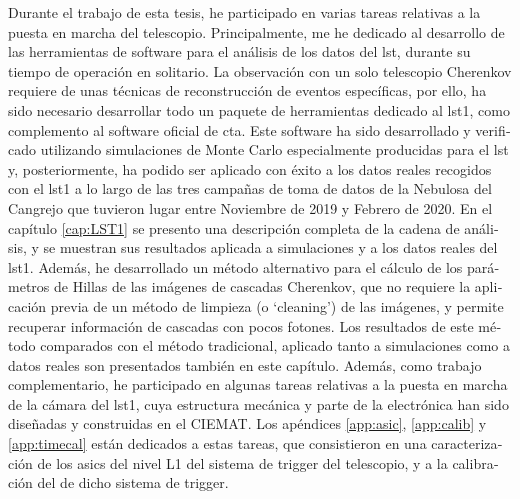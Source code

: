 \documentclass[main.tex]{subfiles}
\begin{document}
\begin{otherlanguage}{spanish}
Durante el trabajo de esta tesis, he participado en varias tareas relativas a la puesta en marcha del telescopio. Principalmente, me he dedicado al desarrollo de las herramientas de software para el análisis de los datos del \gls{lst}, durante su tiempo de operación en solitario. La observación con un solo telescopio Cherenkov requiere de unas técnicas de reconstrucción de eventos específicas, por ello, ha sido necesario desarrollar todo un paquete de herramientas dedicado al \gls{lst}1, como complemento al software oficial de \gls{cta}. Este software ha sido desarrollado y verificado utilizando simulaciones de Monte Carlo especialmente producidas para el \gls{lst} y, posteriormente, ha podido ser aplicado con éxito a los datos reales recogidos con el \gls{lst}1 a lo largo de las tres campañas de toma de datos de la Nebulosa del Cangrejo que tuvieron lugar entre Noviembre de 2019 y Febrero de 2020. En el capítulo \ref{cap:LST1} se presento una descripción completa de la cadena de análisis, y se muestran sus resultados aplicada a simulaciones y a los datos reales del \gls{lst}1. Además, he desarrollado un método alternativo para el cálculo de los parámetros de Hillas de las imágenes de cascadas Cherenkov, que no requiere la aplicación previa de un método de limpieza (o `cleaning') de las imágenes, y permite recuperar información de cascadas con pocos fotones. Los resultados de este método comparados con el método tradicional, aplicado tanto a simulaciones como a datos reales son presentados también en este capítulo. Además, como trabajo complementario, he participado en algunas tareas relativas a la puesta en marcha de la cámara del \gls{lst}1, cuya estructura mecánica y parte de la electrónica han sido diseñadas y construidas en el CIEMAT. Los apéndices \ref{app:asic}, \ref{app:calib} y \ref{app:timecal} están dedicados a estas tareas, que consistieron en una caracterización de los \glspl{asic} del nivel L1 del sistema de trigger del telescopio, y a la calibración del de dicho sistema de trigger.\\

\end{otherlanguage}
\end{document}
